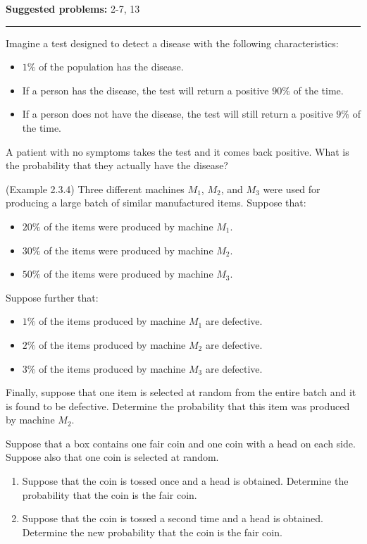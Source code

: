 \documentclass[12pt,reqno]{amsart}
\begin{document}
\textbf{Suggested problems:} 2-7, 13

\bigskip
\hrule

\bigskip

\prob Imagine a test designed to detect a disease with the following characteristics:
\begin{itemize}
\item $1\%$ of the population has the disease.
\item If a person has the disease, the test will return a positive $90\%$ of the time.
\item If a person does not have the disease, the test will still return a positive $9\%$ of the time.
\end{itemize}
A patient with no symptoms takes the test and it comes back positive. What is the probability that they actually have the disease?

\vfill
\prob (Example 2.3.4) Three different machines $M_1$, $M_2$, and $M_3$ were used for producing a large batch of similar manufactured items. Suppose that:
\begin{itemize}
\item $20\%$ of the items were produced by machine $M_1$.
\item $30\%$ of the items were produced by machine $M_2$.
\item $50\%$ of the items were produced by machine $M_3$.
\end{itemize}
Suppose further that:
\begin{itemize}
\item $1\%$ of the items produced by machine $M_1$ are defective.
\item $2\%$ of the items produced by machine $M_2$ are defective.
\item $3\%$ of the items produced by machine $M_3$ are defective.
\end{itemize}
Finally, suppose that one item is selected at random from the entire batch and it is
found to be defective. Determine the probability that this item was produced
by machine $M_2$.

\vfill
\newpage
\prob Suppose that a box contains one fair coin and one coin with a head on each side. Suppose also that one coin is selected at random.

\medskip
\begin{enumerate}
\item Suppose that the coin is tossed once and a head is obtained. Determine the probability that the coin is the fair coin.
\item Suppose that the coin is tossed a second time and a head is obtained. Determine the new probability that the coin is the fair coin.
\end{enumerate}
\end{document}
